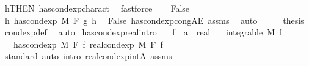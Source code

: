 \begin{isabellebody}
\ h{\isacharbrackleft}{\kern0pt}THEN\ has{\isacharunderscore}{\kern0pt}cond{\isacharunderscore}{\kern0pt}exp{\isacharunderscore}{\kern0pt}charact{\isacharparenleft}{\kern0pt}{}{\isacharparenright}{\kern0pt}{\isacharbrackright}{\kern0pt}\ \isamarkupfalse%
\ fastforce\isanewline
{}\isamarkupfalse%
\isanewline
\ \ \isamarkupfalse%
\ False\isanewline
\ \ \isamarkupfalse%
\ \isamarkupfalse%
\ {\isachardoublequoteopen}{\isasymnexists}h{\isachardot}{\kern0pt}\ has{\isacharunderscore}{\kern0pt}cond{\isacharunderscore}{\kern0pt}exp\ M\ F\ g\ h{\isachardoublequoteclose}\ \isamarkupfalse%
\ False\ has{\isacharunderscore}{\kern0pt}cond{\isacharunderscore}{\kern0pt}exp{\isacharunderscore}{\kern0pt}cong{\isacharunderscore}{\kern0pt}AE\ assms\ \isamarkupfalse%
\ auto\isanewline
\ \ \isamarkupfalse%
\ \isamarkupfalse%
\ {\isacharquery}{\kern0pt}thesis\ \isamarkupfalse%
\ cond{\isacharunderscore}{\kern0pt}exp{\isacharunderscore}{\kern0pt}def\ \isamarkupfalse%
\ auto\isanewline
{}\isamarkupfalse%
%
\endisatagproof
{\isafoldproof}%
%
\isadelimproof
\isanewline
%
\endisadelimproof
\isanewline
{}\isamarkupfalse%
\ has{\isacharunderscore}{\kern0pt}cond{\isacharunderscore}{\kern0pt}exp{\isacharunderscore}{\kern0pt}real{\isacharbrackleft}{\kern0pt}intro{\isacharbrackright}{\kern0pt}{\isacharcolon}{\kern0pt}\isanewline
\ \ \ f\ {\isacharcolon}{\kern0pt}{\isacharcolon}{\kern0pt}\ {\isachardoublequoteopen}{\isacharprime}{\kern0pt}a\ {\isasymRightarrow}\ real{\isachardoublequoteclose}\isanewline
\ \ \ {\isachardoublequoteopen}integrable\ M\ f{\isachardoublequoteclose}\isanewline
\ \ \ {\isachardoublequoteopen}has{\isacharunderscore}{\kern0pt}cond{\isacharunderscore}{\kern0pt}exp\ M\ F\ f\ {\isacharparenleft}{\kern0pt}real{\isacharunderscore}{\kern0pt}cond{\isacharunderscore}{\kern0pt}exp\ M\ F\ f{\isacharparenright}{\kern0pt}{\isachardoublequoteclose}\isanewline
%
\isadelimproof
\ \ %
\endisadelimproof
%
\isatagproof
{}\isamarkupfalse%
\ {\isacharparenleft}{\kern0pt}standard{\isacharcomma}{\kern0pt}\ auto\ intro{\isacharbang}{\kern0pt}{\isacharcolon}{\kern0pt}\ real{\isacharunderscore}{\kern0pt}cond{\isacharunderscore}{\kern0pt}exp{\isacharunderscore}{\kern0pt}intA\ assms{\isacharparenright}{\kern0pt}%
\endisatagproof
{\isafoldproof}%
%
\isadelimproof
\isanewline
%
\endisadelimproof

\end{isabellebody}
